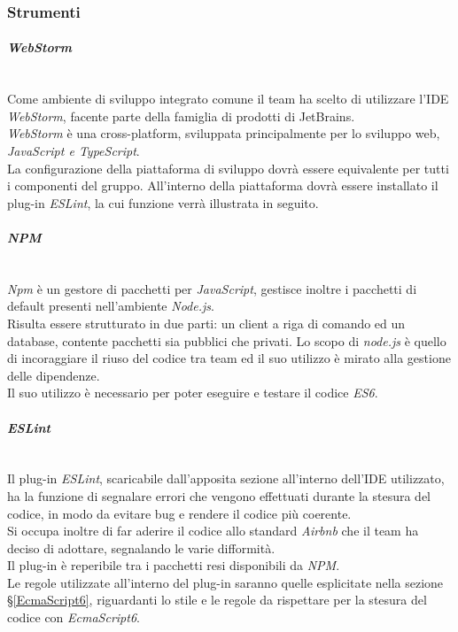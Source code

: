 \subsubsection{Strumenti}\label{SviluppoStrumenti}

\paragraph{\textit{WebStorm}}\-\\
Come ambiente di sviluppo integrato comune il team ha scelto di utilizzare l'IDE \textit{WebStorm}, facente parte della famiglia di prodotti di JetBrains. \\
\textit{WebStorm} è una cross-platform, sviluppata principalmente per lo sviluppo web, \textit{JavaScript e TypeScript}. \\
La configurazione della piattaforma di sviluppo dovrà essere equivalente per tutti i componenti del gruppo. All'interno della piattaforma dovrà essere installato il plug-in \textit{ESLint}, la cui funzione verrà illustrata in seguito.

\paragraph{\textit{NPM}}\label{NPM} \-\\
\textit{Npm} è un gestore di pacchetti per \textit{JavaScript}, gestisce inoltre i pacchetti di default presenti nell'ambiente \textit{Node.js}\glossario.\\
Risulta essere strutturato in due parti: un client a riga di comando ed un database, contente pacchetti sia pubblici che privati. Lo scopo di \textit{node.js} è quello di incoraggiare il riuso del codice tra team ed il suo utilizzo è mirato alla gestione delle dipendenze.\\ 
Il suo utilizzo è necessario per poter eseguire e testare il codice \textit{ES6}.

\paragraph{\textit{ESLint}}\-\\
Il plug-in \textit{ESLint}, scaricabile dall'apposita sezione all'interno dell'IDE utilizzato, ha la funzione di segnalare errori che vengono effettuati durante la stesura del codice, in modo da evitare bug e rendere il codice più coerente. \\ 
Si occupa inoltre di far aderire il codice allo standard \textit{Airbnb} che il team ha deciso di adottare, segnalando le varie difformità.\\
Il plug-in è reperibile tra i pacchetti resi disponibili da \textit{NPM}.\\
Le regole utilizzate all'interno del plug-in saranno quelle esplicitate nella sezione §\ref{EcmaScript6}, riguardanti lo stile e le regole da rispettare per la stesura del codice con \textit{EcmaScript6}.

